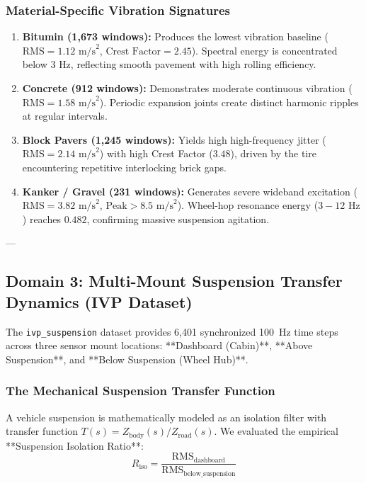 \subsubsection{Material-Specific Vibration Signatures}
\begin{enumerate}
    \item \textbf{Bitumin (1,673 windows):} Produces the lowest vibration baseline ($\text{RMS} = 1.12\text{ m/s}^2$, $\text{Crest Factor} = 2.45$). Spectral energy is concentrated below $3\text{ Hz}$, reflecting smooth pavement with high rolling efficiency.
    \item \textbf{Concrete (912 windows):} Demonstrates moderate continuous vibration ($\text{RMS} = 1.58\text{ m/s}^2$). Periodic expansion joints create distinct harmonic ripples at regular intervals.
    \item \textbf{Block Pavers (1,245 windows):} Yields high high-frequency jitter ($\text{RMS} = 2.14\text{ m/s}^2$) with high Crest Factor ($3.48$), driven by the tire encountering repetitive interlocking brick gaps.
    \item \textbf{Kanker / Gravel (231 windows):} Generates severe wideband excitation ($\text{RMS} = 3.82\text{ m/s}^2$, $\text{Peak} > 8.5\text{ m/s}^2$). Wheel-hop resonance energy ($3-12\text{ Hz}$) reaches $0.482$, confirming massive suspension agitation.
\end{enumerate}

---

\subsection{Domain 3: Multi-Mount Suspension Transfer Dynamics (IVP Dataset)}
The \texttt{ivp\_suspension} dataset provides 6,401 synchronized 100~Hz time steps across three sensor mount locations: **Dashboard (Cabin)**, **Above Suspension**, and **Below Suspension (Wheel Hub)**.

\subsubsection{The Mechanical Suspension Transfer Function}
A vehicle suspension is mathematically modeled as an isolation filter with transfer function $T(s) = Z_{\text{body}}(s) / Z_{\text{road}}(s)$. We evaluated the empirical **Suspension Isolation Ratio**:
\begin{equation}
R_{\text{iso}} = \frac{\text{RMS}_{\text{dashboard}}}{\text{RMS}_{\text{below\_suspension}}}
\end{equation}

